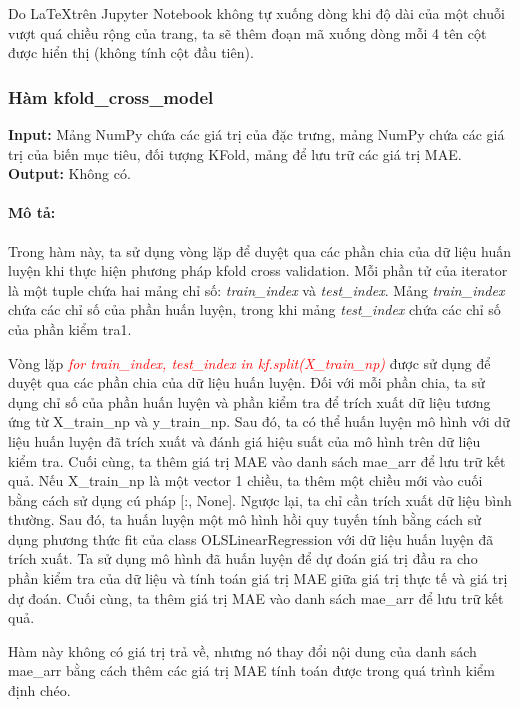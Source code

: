 \documentclass[]{article}
\begin{document}
Do \LaTeX \space trên Jupyter Notebook không tự xuống dòng khi độ dài của một chuỗi vượt quá chiều rộng của trang, ta sẽ thêm đoạn mã xuống dòng mỗi 4 tên cột được hiển thị (không tính cột đầu tiên).

\subsubsection{Hàm kfold\_cross\_model} \label{kfoldcrossmodel}
\noindent
\textbf{Input:} Mảng NumPy chứa các giá trị của đặc trưng, mảng NumPy chứa các giá trị của biến mục tiêu, đối tượng KFold, mảng để lưu trữ các giá trị MAE. \\
\textbf{Output:} Không có.
\paragraph{Mô tả:}

Trong hàm này, ta sử dụng vòng lặp để duyệt qua các phần chia của dữ liệu huấn luyện khi thực hiện phương pháp kfold cross validation. Mỗi phần tử của iterator là một tuple chứa hai mảng chỉ số: \textit{train\_index} và \textit{test\_index}. Mảng \textit{train\_index} chứa các chỉ số của phần huấn luyện, trong khi mảng \textit{test\_index} chứa các chỉ số của phần kiểm tra1.

Vòng lặp \textcolor{red}{\textit{for train\_index, test\_index in kf.split(X\_train\_np)}} được sử dụng để duyệt qua các phần chia của dữ liệu huấn luyện. Đối với mỗi phần chia, ta sử dụng chỉ số của phần huấn luyện và phần kiểm tra để trích xuất dữ liệu tương ứng từ X\_train\_np và y\_train\_np. Sau đó, ta có thể huấn luyện mô hình với dữ liệu huấn luyện đã trích xuất và đánh giá hiệu suất của mô hình trên dữ liệu kiểm tra. Cuối cùng, ta thêm giá trị MAE vào danh sách mae\_arr để lưu trữ kết quả. Nếu X\_train\_np là một vector 1 chiều, ta thêm một chiều mới vào cuối bằng cách sử dụng cú pháp [:, None]. Ngược lại, ta chỉ cần trích xuất dữ liệu bình thường. Sau đó, ta huấn luyện một mô hình hồi quy tuyến tính bằng cách sử dụng phương thức fit của class OLSLinearRegression với dữ liệu huấn luyện đã trích xuất. Ta sử dụng mô hình đã huấn luyện để dự đoán giá trị đầu ra cho phần kiểm tra của dữ liệu và tính toán giá trị MAE giữa giá trị thực tế và giá trị dự đoán. Cuối cùng, ta thêm giá trị MAE vào danh sách mae\_arr để lưu trữ kết quả.

Hàm này không có giá trị trả về, nhưng nó thay đổi nội dung của danh sách mae\_arr bằng cách thêm các giá trị MAE tính toán được trong quá trình kiểm định chéo.
\end{document}

